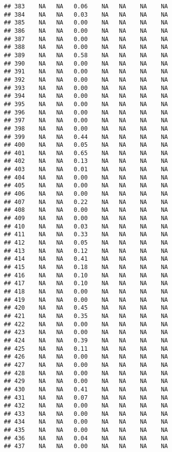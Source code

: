 \documentclass{article}\usepackage{graphicx, color}
\makeatletter
\newenvironment{kframe}{%
 \def\at@end@of@kframe{}%
 \ifinner\ifhmode%
  \def\at@end@of@kframe{\end{minipage}}%
  \begin{minipage}{\columnwidth}%
 \fi\fi%
 \def\FrameCommand##1{\hskip\@totalleftmargin \hskip-\fboxsep
 \colorbox{shadecolor}{##1}\hskip-\fboxsep
     \hskip-\linewidth \hskip-\@totalleftmargin \hskip\columnwidth}%
 \MakeFramed {\advance\hsize-\width
   \@totalleftmargin\z@ \linewidth\hsize
   \@setminipage}}%
 {\par\unskip\endMakeFramed%
 \at@end@of@kframe}
\newenvironment{knitrout}{}{} %
\makeatother
\begin{document}
\begin{knitrout}
\begin{kframe}
\begin{verbatim}
## 383    NA   NA   0.06    NA   NA    NA    NA
## 384    NA   NA   0.03    NA   NA    NA    NA
## 385    NA   NA   0.00    NA   NA    NA    NA
## 386    NA   NA   0.00    NA   NA    NA    NA
## 387    NA   NA   0.00    NA   NA    NA    NA
## 388    NA   NA   0.00    NA   NA    NA    NA
## 389    NA   NA   0.58    NA   NA    NA    NA
## 390    NA   NA   0.00    NA   NA    NA    NA
## 391    NA   NA   0.00    NA   NA    NA    NA
## 392    NA   NA   0.00    NA   NA    NA    NA
## 393    NA   NA   0.00    NA   NA    NA    NA
## 394    NA   NA   0.00    NA   NA    NA    NA
## 395    NA   NA   0.00    NA   NA    NA    NA
## 396    NA   NA   0.00    NA   NA    NA    NA
## 397    NA   NA   0.00    NA   NA    NA    NA
## 398    NA   NA   0.00    NA   NA    NA    NA
## 399    NA   NA   0.44    NA   NA    NA    NA
## 400    NA   NA   0.05    NA   NA    NA    NA
## 401    NA   NA   0.65    NA   NA    NA    NA
## 402    NA   NA   0.13    NA   NA    NA    NA
## 403    NA   NA   0.01    NA   NA    NA    NA
## 404    NA   NA   0.00    NA   NA    NA    NA
## 405    NA   NA   0.00    NA   NA    NA    NA
## 406    NA   NA   0.00    NA   NA    NA    NA
## 407    NA   NA   0.22    NA   NA    NA    NA
## 408    NA   NA   0.00    NA   NA    NA    NA
## 409    NA   NA   0.00    NA   NA    NA    NA
## 410    NA   NA   0.03    NA   NA    NA    NA
## 411    NA   NA   0.33    NA   NA    NA    NA
## 412    NA   NA   0.05    NA   NA    NA    NA
## 413    NA   NA   0.12    NA   NA    NA    NA
## 414    NA   NA   0.41    NA   NA    NA    NA
## 415    NA   NA   0.18    NA   NA    NA    NA
## 416    NA   NA   0.10    NA   NA    NA    NA
## 417    NA   NA   0.10    NA   NA    NA    NA
## 418    NA   NA   0.00    NA   NA    NA    NA
## 419    NA   NA   0.00    NA   NA    NA    NA
## 420    NA   NA   0.45    NA   NA    NA    NA
## 421    NA   NA   0.35    NA   NA    NA    NA
## 422    NA   NA   0.00    NA   NA    NA    NA
## 423    NA   NA   0.00    NA   NA    NA    NA
## 424    NA   NA   0.39    NA   NA    NA    NA
## 425    NA   NA   0.11    NA   NA    NA    NA
## 426    NA   NA   0.00    NA   NA    NA    NA
## 427    NA   NA   0.00    NA   NA    NA    NA
## 428    NA   NA   0.00    NA   NA    NA    NA
## 429    NA   NA   0.00    NA   NA    NA    NA
## 430    NA   NA   0.41    NA   NA    NA    NA
## 431    NA   NA   0.07    NA   NA    NA    NA
## 432    NA   NA   0.00    NA   NA    NA    NA
## 433    NA   NA   0.00    NA   NA    NA    NA
## 434    NA   NA   0.00    NA   NA    NA    NA
## 435    NA   NA   0.00    NA   NA    NA    NA
## 436    NA   NA   0.04    NA   NA    NA    NA
## 437    NA   NA   0.00    NA   NA    NA    NA

\end{verbatim}
\end{kframe}
\end{knitrout}
\end{document}
